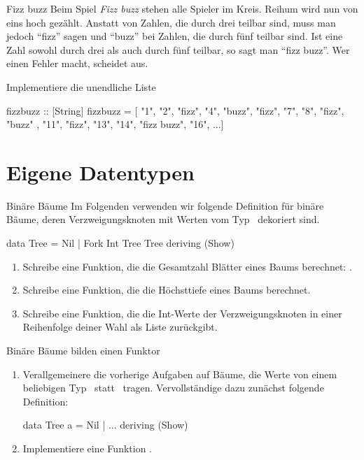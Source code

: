 \documentclass{uebblatt}
\begin{document}
\begin{aufgabe}{Fizz buzz}
  Beim Spiel \emph{Fizz buzz} stehen alle Spieler im Kreis. Reihum wird nun von eins hoch gezählt. Anstatt von Zahlen, die durch drei teilbar sind, muss man jedoch "`fizz"' sagen und "`buzz"' bei Zahlen, die durch fünf teilbar sind. Ist eine Zahl sowohl durch drei als auch durch fünf teilbar, so sagt man "`fizz buzz"'. Wer einen Fehler macht, scheidet aus.
  
  Implementiere die unendliche Liste
  \begin{haskellcode}
fizzbuzz :: [String]
fizzbuzz = [ "1", "2", "fizz", "4", "buzz", "fizz", "7", "8", "fizz", "buzz"
           , "11", "fizz", "13", "14", "fizz buzz", "16", ...]
  \end{haskellcode}
\end{aufgabe}


\section{Eigene Datentypen}

\begin{aufgabe}{Binäre Bäume}
Im Folgenden verwenden wir folgende Definition für binäre Bäume, deren
Verzweigungsknoten mit Werten vom Typ~ dekoriert sind.
\begin{haskellcode}
data Tree = Nil | Fork Int Tree Tree
    deriving (Show)
\end{haskellcode}
\begin{enumerate}
\item Schreibe eine Funktion, die die Gesamtzahl Blätter eines Baums berechnet:
.
\item Schreibe eine Funktion, die die Höchsttiefe eines Baums berechnet.
\item Schreibe eine Funktion, die die Int-Werte der Verzweigungsknoten in einer
Reihenfolge deiner Wahl als Liste zurückgibt.
\end{enumerate}
\end{aufgabe}

\begin{aufgabe}{Binäre Bäume bilden einen Funktor}
\begin{enumerate}
\item Verallgemeinere die vorherige Aufgaben auf Bäume, die Werte von
einem beliebigen Typ~ statt~ tragen.
Vervollständige dazu zunächst folgende Definition:
\begin{haskellcode}
data Tree a = Nil | ...
    deriving (Show)
\end{haskellcode}
\item Implementiere eine Funktion .
\end{enumerate}
\end{aufgabe}
\end{document}
